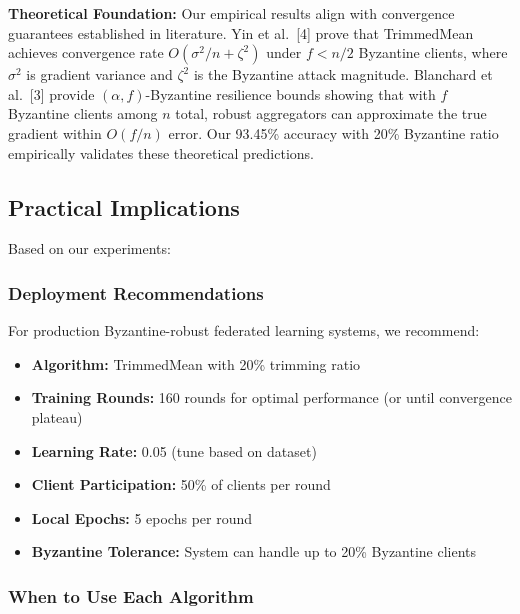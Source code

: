 \documentclass[12pt,a4paper,onecolumn]{article}
\begin{document}
\textbf{Theoretical Foundation:} Our empirical results align with convergence guarantees established in literature. Yin et al.~[4] prove that TrimmedMean achieves convergence rate $O(\sigma^2/n + \zeta^2)$ under $f < n/2$ Byzantine clients, where $\sigma^2$ is gradient variance and $\zeta^2$ is the Byzantine attack magnitude. Blanchard et al.~[3] provide $(\alpha, f)$-Byzantine resilience bounds showing that with $f$ Byzantine clients among $n$ total, robust aggregators can approximate the true gradient within $O(f/n)$ error. Our 93.45\% accuracy with 20\% Byzantine ratio empirically validates these theoretical predictions.

\subsection{Practical Implications}

Based on our experiments:

\subsubsection{Deployment Recommendations}

For production Byzantine-robust federated learning systems, we recommend:
\begin{itemize}
    \item \textbf{Algorithm:} TrimmedMean with 20\% trimming ratio
    \item \textbf{Training Rounds:} 160 rounds for optimal performance (or until convergence plateau)
    \item \textbf{Learning Rate:} 0.05 (tune based on dataset)
    \item \textbf{Client Participation:} 50\% of clients per round
    \item \textbf{Local Epochs:} 5 epochs per round
    \item \textbf{Byzantine Tolerance:} System can handle up to 20\% Byzantine clients
\end{itemize}

\subsubsection{When to Use Each Algorithm}
\end{document}
